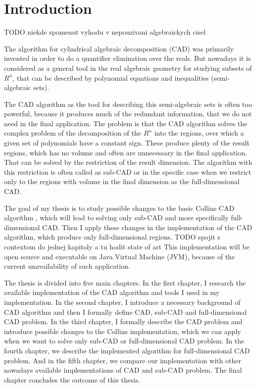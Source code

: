 \documentclass[
  digital, %
  twoside, %
  table,   %
  nolof,     %
  nolot,     %
]{fithesis3}
\begin{document}
\chapter*{Introduction}

TODO niekde spomenut vyhodu v nepouzivani algebraickych cisel

The algorithm for cylindrical algebraic decomposition (CAD) was primarily invented in order to do a quantifier elimination over the reals. But nowadays it is considered as a general tool in the real algebraic geometry for studying subsets of $R^n$, that can be described by polynomial equations and inequalities (semi-algebraic sets).

The CAD algorithm as the tool for describing this semi-algebraic sets is often too powerful, because it produces much of the redundant information, that we do not need in the final application. The problem is that the CAD algorithm solves the complex problem of the decomposition of the $R^n$ into the regions, over which a given set of polynomials have a constant sign. These produce plenty of the result regions, which has no volume and often are unnecessary in the final application. That can be solved by the restriction of the result dimension. The algorithm with this restriction is often called as sub-CAD or in the specific case when we restrict only to the regions with volume in the final dimension as the full-dimensional CAD.

The goal of my thesis is to study possible changes to the basic Collins CAD algorithm  , which will lead to solving only sub-CAD and more specifically full-dimensional CAD. Then I apply these changes in the implementation of the CAD algorithm, which produce only full-dimensional regions. 
\newline
TODO spojit s contextom do jednej kapitoly a tu hodit state of art
\newline
This implementation will be open source and executable on Java Virtual Machine (JVM), because of the current unavailability of such application.

The thesis is divided into five main chapters. In the first chapter, I research the available implementation of the CAD algorithm and tools I used in my implementation. In the second chapter, I introduce a necessary background of CAD algorithm and then I formally define CAD, sub-CAD and full-dimensional CAD problem.
In the third chapter, I formally describe the CAD problem and introduce possible changes to the Collins implementation, which we can apply when we want to solve only sub-CAD or full-dimensional CAD problem. In the fourth chapter, we describe the implemented algorithm for full-dimensional CAD problem. And in the fifth chapter, we compare our implementation with other nowadays available implementations of CAD and sub-CAD problem. The final chapter concludes the outcome of this thesis.
\end{document}

